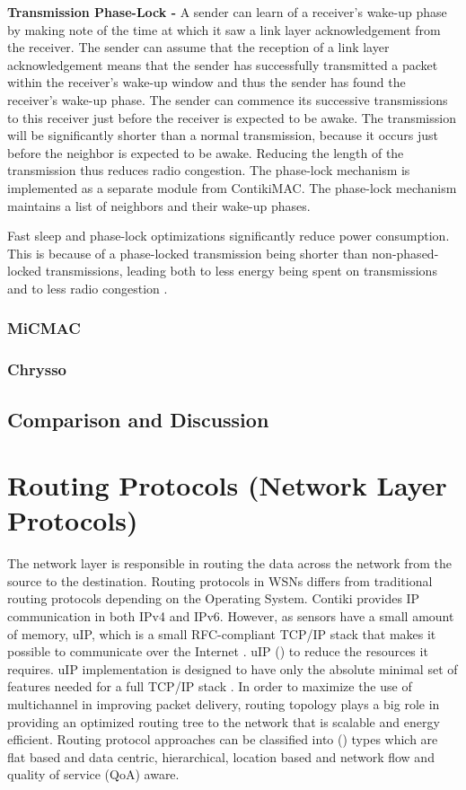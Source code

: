 \textbf{Transmission Phase-Lock - }
A sender can learn of a receiver's wake-up phase by making note of the time at which it saw a link layer acknowledgement from the receiver. The sender can assume that the reception of a link layer acknowledgement means that the sender has successfully transmitted a packet within the receiver's wake-up window and thus the sender has found the receiver's wake-up phase. The sender can commence its successive transmissions to this receiver just before the receiver is expected to be awake. The transmission will be significantly shorter than a normal transmission, because it occurs just before the neighbor is expected to be awake. Reducing the length of the transmission thus reduces radio congestion.
	The phase-lock mechanism is implemented as a separate module from ContikiMAC.
	The phase-lock mechanism maintains a list of neighbors and their wake-up phases.
	
Fast sleep and phase-lock optimizations significantly reduce power consumption. This is because of a phase-locked transmission being shorter than non-phased-locked transmissions, leading both to less energy being spent on transmissions and to less radio congestion \cite{contikimac}.

\subsubsection{MiCMAC}

\subsubsection{Chrysso}

\subsection{Comparison and Discussion}

\section{Routing Protocols (Network Layer Protocols)}
The network layer is responsible in routing the data across the network from the source to the destination. Routing protocols in WSNs differs from traditional routing protocols depending on the Operating System.
Contiki provides IP communication in both IPv4 and IPv6. However, as sensors have a small amount of memory, uIP, which is a small RFC-compliant TCP/IP stack that makes it possible to communicate over the Internet \cite{contikiDoc, contikiUIP}. uIP () to reduce the resources it requires.
uIP implementation is designed to have only the absolute minimal set of features needed for a full TCP/IP stack \cite{contikiDoc, contikiUIP}.
In order to maximize the use of multichannel in improving packet delivery, routing topology plays a big role in providing an optimized routing tree to the network that is scalable and energy efficient. 
Routing protocol approaches can be classified into () types which are flat based and data centric, hierarchical, location based and network flow and quality of service (QoA) aware.

